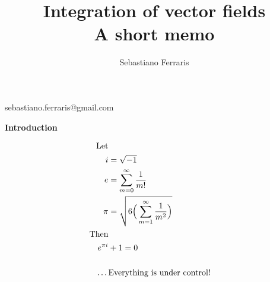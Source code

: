 \documentclass{ClassNotes}
\begin{document}
\title{Integration of vector fields \\ A short memo}

\IssueDue

\author{Sebastiano Ferraris}{sebastiano.ferraris@gmail.com}


\maketitle

\begin{center}
 {\bf Introduction}
 
 \begin{align*}
 \text{Let} \\
 i &= \sqrt{-1}\\
 e &= \sum_{m=0}^{\infty} \frac{1}{m!} \\
 \pi &= \sqrt{ 6 \Big( \sum_{m=1}^{\infty} \frac{1}{m^2} \Big)}\\
 \text{Then} \\
 e^{\pi i}& + 1 = 0 \\
 \text{~} \\
 \text{\dots}&\text{Everything is under control!}
 \end{align*}
\end{center}



\Body %




\clearpage
\pagestyle{empty}

 \tableofcontents

\clearpage


\pagestyle{fancy} 


\end{document}
